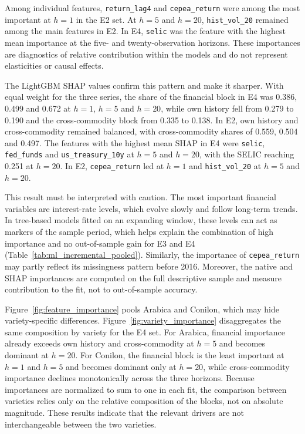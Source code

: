 \documentclass[a4paper,fleqn]{cas-sc}
\begin{document}
Among individual features, \texttt{return\_lag4} and \texttt{cepea\_return} were among the most important at \(h=1\) in the E2 set. At \(h=5\) and \(h=20\), \texttt{hist\_vol\_20} remained among the main features in E2. In E4, \texttt{selic} was the feature with the highest mean importance at the five- and twenty-observation horizons. These importances are diagnostics of relative contribution within the models and do not represent elasticities or causal effects.

The LightGBM SHAP values confirm this pattern and make it sharper. With equal weight for the three series, the share of the financial block in E4 was 0.386, 0.499 and 0.672 at \(h=1\), \(h=5\) and \(h=20\), while own history fell from 0.279 to 0.190 and the cross-commodity block from 0.335 to 0.138. In E2, own history and cross-commodity remained balanced, with cross-commodity shares of 0.559, 0.504 and 0.497. The features with the highest mean SHAP in E4 were \texttt{selic}, \texttt{fed\_funds} and \texttt{us\_treasury\_10y} at \(h=5\) and \(h=20\), with the SELIC reaching 0.251 at \(h=20\). In E2, \texttt{cepea\_return} led at \(h=1\) and \texttt{hist\_vol\_20} at \(h=5\) and \(h=20\).

This result must be interpreted with caution. The most important financial variables are interest-rate levels, which evolve slowly and follow long-term trends. In tree-based models fitted on an expanding window, these levels can act as markers of the sample period, which helps explain the combination of high importance and no out-of-sample gain for E3 and E4 (Table~\ref{tab:ml_incremental_pooled}). Similarly, the importance of \texttt{cepea\_return} may partly reflect its missingness pattern before 2016. Moreover, the native and SHAP importances are computed on the full descriptive sample and measure contribution to the fit, not to out-of-sample accuracy.

Figure~\ref{fig:feature_importance} pools Arabica and Conilon, which may hide variety-specific differences. Figure~\ref{fig:variety_importance} disaggregates the same composition by variety for the E4 set. For Arabica, financial importance already exceeds own history and cross-commodity at \(h=5\) and becomes dominant at \(h=20\). For Conilon, the financial block is the least important at \(h=1\) and \(h=5\) and becomes dominant only at \(h=20\), while cross-commodity importance declines monotonically across the three horizons. Because importances are normalized to sum to one in each fit, the comparison between varieties relies only on the relative composition of the blocks, not on absolute magnitude. These results indicate that the relevant drivers are not interchangeable between the two varieties.
\end{document}
